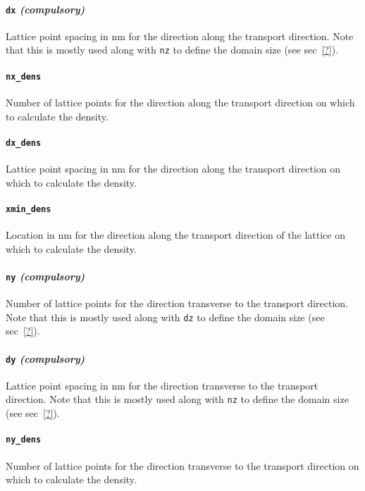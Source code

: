 \documentclass[12pt]{article}
\begin{document}
\paragraph{\texttt{dx} \emph{(compulsory)}}
Lattice point spacing in nm for the direction along the transport direction.
Note that this is mostly used along with \texttt{nz} to define the domain size (see
sec~\ref{?}).

\paragraph{\texttt{nx\_dens}}
Number of lattice points for the direction along the transport direction on which
to calculate the density.

\paragraph{\texttt{dx\_dens}}
Lattice point spacing in nm for the direction along the transport direction on
which to calculate the density.

\paragraph{\texttt{xmin\_dens}}
Location in nm for the direction along the transport direction of the lattice on
which to calculate the density.

\paragraph{\texttt{ny} \emph{(compulsory)}}
Number of lattice points for the direction transverse to the transport direction.  Note
that this is mostly used along with \texttt{dz} to define the domain size (see sec~\ref{?}).

\paragraph{\texttt{dy} \emph{(compulsory)}}
Lattice point spacing in nm for the direction transverse to the transport direction.
Note that this is mostly used along with \texttt{nz} to define the domain size (see
sec~\ref{?}).

\paragraph{\texttt{ny\_dens}}
Number of lattice points for the direction transverse to the transport direction on which
to calculate the density.
\end{document}
